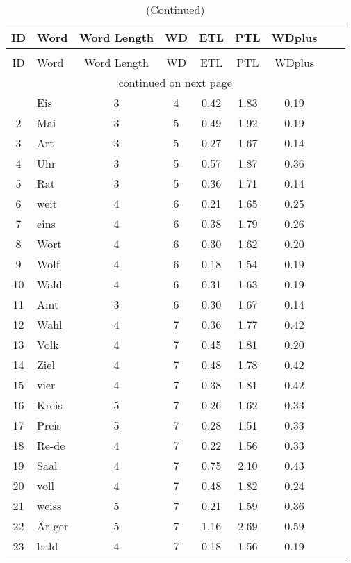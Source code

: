 {\scriptsize
\begin{longtable}{clccccccc}
\caption[wordlist]{A sample list of words.}\\
\toprule
ID & Word & Word Length & WD & ETL & PTL &  WDplus \\
\midrule
\endfirsthead
\caption[]{(Continued)}\\
\toprule
ID & Word & Word Length & WD & ETL & PTL &  WDplus \\
\midrule
\endhead
\midrule
\multicolumn{9}{c}{continued on next page}\\
\bottomrule
\endfoot
\endlastfoot
\hline
1 & Eis & 3 & 4 & 0.42 & 1.83 & 0.19 \\ \hline
2 & Mai & 3 & 5 & 0.49 & 1.92 & 0.19 \\ \hline
3 & Art & 3 & 5 & 0.27 & 1.67 & 0.14 \\ \hline
4 & Uhr & 3 & 5 & 0.57 & 1.87 & 0.36 \\ \hline
5 & Rat & 3 & 5 & 0.36 & 1.71 & 0.14 \\ \hline
6 & weit & 4 & 6 & 0.21 & 1.65 & 0.25 \\ \hline
7 & eins & 4 & 6 & 0.38 & 1.79 & 0.26 \\ \hline
8 & Wort & 4 & 6 & 0.30 & 1.62 & 0.20 \\ \hline
9 & Wolf & 4 & 6 & 0.18 & 1.54 & 0.19 \\ \hline
10 & Wald & 4 & 6 & 0.31 & 1.63 & 0.19 \\ \hline
11 & Amt & 3 & 6 & 0.30 & 1.67 & 0.14 \\ \hline
12 & Wahl & 4 & 7 & 0.36 & 1.77 & 0.42 \\ \hline
13 & Volk & 4 & 7 & 0.45 & 1.81 & 0.20 \\ \hline
14 & Ziel & 4 & 7 & 0.48 & 1.78 & 0.42 \\ \hline
15 & vier & 4 & 7 & 0.38 & 1.81 & 0.42 \\ \hline
16 & Kreis & 5 & 7 & 0.26 & 1.62 & 0.33 \\ \hline
17 & Preis & 5 & 7 & 0.28 & 1.51 & 0.33 \\ \hline
18 & Re-de & 4 & 7 & 0.22 & 1.56 & 0.33 \\ \hline
19 & Saal & 4 & 7 & 0.75 & 2.10 & 0.43 \\ \hline
20 & voll & 4 & 7 & 0.48 & 1.82 & 0.24 \\ \hline
21 & weiss & 5 & 7 & 0.21 & 1.59 & 0.36 \\ \hline
22 & Är-ger & 5 & 7 & 1.16 & 2.69 & 0.59 \\ \hline
23 & bald & 4 & 7 & 0.18 & 1.56 & 0.19 \\ \hline

\end{longtable}}
